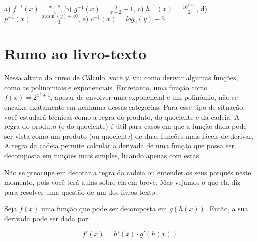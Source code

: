 \documentclass[main.tex]{subfiles}
\begin{document}

\begin{gabarito}
	\begin{gabaritoQuestao}
		a) $f^{-1}(x)=\frac{x+8}{4}$, b) $g^{-1}(x)=\frac{3}{x-2}+1$, c) $h^{-1}(x)=\frac{10^{x-3}}{2}$, d) $p^{-1}(x)=\frac{\arcsin(y)+10}{3}$, e) $c^{-1}(x)=log_2 (y)-5$.
	\end{gabaritoQuestao}
\end{gabarito}

\section{Rumo ao livro-texto}


Nessa altura do curso de Cálculo, você já viu como derivar algumas funções, como as polinomiais e exponenciais.  Entretanto, uma função como $f(x)=2^{x^3+1}$, apesar de envolver uma exponencial e um polinômio, não se encaixa exatamente em nenhuma dessas categorias. Para esse tipo de situação, você estudará técnicas como a regra do produto, do quociente e da cadeia. A regra do produto (e do quociente) é útil para casos em que a função dada pode ser vista como um produto (ou quociente) de duas funções mais fáceis de derivar. A regra da cadeia permite calcular a derivada de uma função que possa ser decomposta em funções mais simples, lidando apenas com estas.

Não se preocupe em decorar a regra da cadeia ou entender os seus porquês neste momento, pois você terá aulas sobre ela em breve. Mas vejamos o que ela diz para resolver uma questão de um dos livros-texto.

\begin{shaded*}
Seja $f(x)$ uma função que pode ser decomposta em $g(h(x))$. Então, a sua derivada pode ser dada por:

$$f'(x) = h'(x) \cdot g'(h(x)) $$
\end{shaded*}
\end{document}
